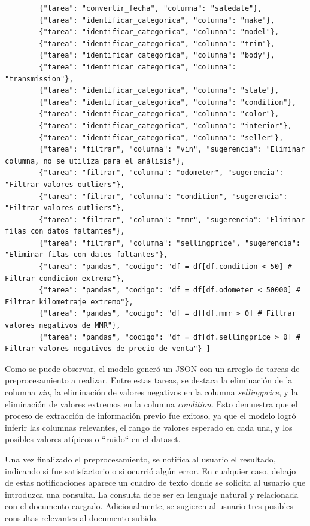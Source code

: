 \begin{lstlisting}
		{"tarea": "convertir_fecha", "columna": "saledate"}, 
		{"tarea": "identificar_categorica", "columna": "make"}, 
		{"tarea": "identificar_categorica", "columna": "model"}, 
		{"tarea": "identificar_categorica", "columna": "trim"}, 
		{"tarea": "identificar_categorica", "columna": "body"}, 
		{"tarea": "identificar_categorica", "columna": "transmission"}, 
		{"tarea": "identificar_categorica", "columna": "state"}, 
		{"tarea": "identificar_categorica", "columna": "condition"}, 
		{"tarea": "identificar_categorica", "columna": "color"}, 
		{"tarea": "identificar_categorica", "columna": "interior"}, 
		{"tarea": "identificar_categorica", "columna": "seller"}, 
		{"tarea": "filtrar", "columna": "vin", "sugerencia": "Eliminar columna, no se utiliza para el análisis"}, 
		{"tarea": "filtrar", "columna": "odometer", "sugerencia": "Filtrar valores outliers"}, 
		{"tarea": "filtrar", "columna": "condition", "sugerencia": "Filtrar valores outliers"}, 
		{"tarea": "filtrar", "columna": "mmr", "sugerencia": "Eliminar filas con datos faltantes"}, 
		{"tarea": "filtrar", "columna": "sellingprice", "sugerencia": "Eliminar filas con datos faltantes"}, 
		{"tarea": "pandas", "codigo": "df = df[df.condition < 50] # Filtrar condicion extrema"}, 
		{"tarea": "pandas", "codigo": "df = df[df.odometer < 50000] # Filtrar kilometraje extremo"}, 
		{"tarea": "pandas", "codigo": "df = df[df.mmr > 0] # Filtrar valores negativos de MMR"}, 
		{"tarea": "pandas", "codigo": "df = df[df.sellingprice > 0] # Filtrar valores negativos de precio de venta"} ]
\end{lstlisting}

Como se puede observar, el modelo generó un JSON con un arreglo de tareas de preprocesamiento a realizar.  Entre estas tareas, se destaca la eliminación de la columna \textit{vin}, la eliminación de valores negativos en la columna \textit{sellingprice}, y la eliminación de valores extremos en la columna \textit{condition}.  Esto demuestra que el proceso de extracción de información previo fue exitoso, ya que el modelo logró inferir las columnas relevantes, el rango de valores esperado en cada una, y los posibles valores atípicos o ``ruido`` en el dataset.

Una vez finalizado el preprocesamiento, se notifica al usuario el resultado, indicando si fue satisfactorio o si ocurrió algún error. En cualquier caso, debajo de estas notificaciones aparece un cuadro de texto donde se solicita al usuario que introduzca una consulta. La consulta debe ser en lenguaje natural y relacionada con el documento cargado. Adicionalmente, se sugieren al usuario tres posibles consultas relevantes al documento subido.

